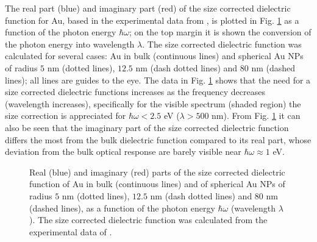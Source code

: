 The real part (blue) and imaginary part (red) of the size corrected dielectric function for Au, based in the experimental data from \citeauthor{johnson_optical_1972} \cite{johnson_optical_1972},  is plotted in Fig. \ref{fig:EpsSize} as a function of the photon energy $\hbar\omega$; on the top margin it is shown the conversion of the photon energy into wavelength $\lambda$. The size corrected dielectric function was calculated for several cases: Au in bulk (continuous lines) and  spherical Au NPs of radius $5$ nm (dotted lines), $12.5$ nm (dash dotted lines) and $80$ nm (dashed lines); all lines are guides to the eye. The data in  Fig. \ref{fig:EpsSize} shows that the need for a size corrected dielectric functions increases as the frequency decreases (wavelength increases), specifically for the visible spectrum (shaded region) the size correction is appreciated for $\hbar \omega < 2.5$ eV ($\lambda>500$ nm). From Fig. \ref{fig:EpsSize} it can also be seen that the imaginary part of the size corrected dielectric function differs the most from the bulk dielectric function compared to its real part, whose deviation from the bulk optical response are barely visible near $\hbar\omega\approx 1$ eV.

   \begin{figure}[h!]
   \def\svgwidth{.85\textwidth} \centering \small
   \caption[Au size corrected dielectric function]{ Real (blue) and imaginary (red) parts of the size corrected dielectric function of Au in bulk (continuous lines) and  of spherical Au NPs of radius $5$ nm (dotted lines), $12.5$ nm (dash dotted lines) and $80$ nm (dashed lines), as a function of the photon energy $\hbar\omega$ (wavelength $\lambda$). The size corrected dielectric function was calculated from the experimental data of \citeauthor{johnson_optical_1972} \cite{johnson_optical_1972}. }
   \label{fig:EpsSize}
   \end{figure}